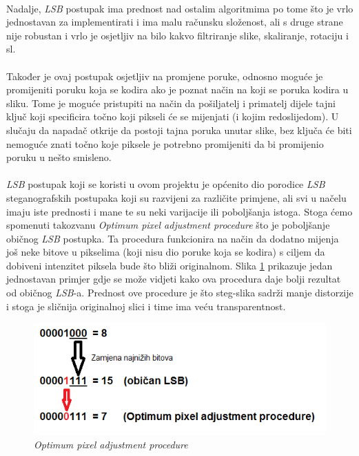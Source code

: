 \documentclass[times, utf8, seminar]{fer}
\begin{document}
\paragraph{}
Nadalje, \textit{LSB} postupak ima prednost nad ostalim algoritmima po tome što je vrlo jednostavan za implementirati i ima malu računsku složenost, ali s druge strane nije robustan i vrlo je osjetljiv na bilo kakvo filtriranje slike, skaliranje, rotaciju i sl. 
\paragraph{}
Također je ovaj postupak osjetljiv na promjene poruke, odnosno moguće je promijeniti poruku koja se kodira ako je poznat način na koji se poruka kodira u sliku. Tome je moguće pristupiti na način da pošiljatelj i primatelj dijele tajni ključ koji specificira točno koji pikseli će se mijenjati (i kojim redoslijedom). U slučaju da napadač otkrije da postoji tajna poruka unutar slike, bez ključa će biti nemoguće znati točno koje piksele je potrebno promijeniti da bi promijenio poruku u nešto smisleno.
\paragraph{}
\textit{LSB} postupak koji se koristi u ovom projektu je općenito dio porodice \textit{LSB} steganografskih postupaka koji su razvijeni za različite primjene, ali svi u načelu imaju iste prednosti i mane te su neki varijacije ili poboljšanja istoga. Stoga ćemo spomenuti takozvanu \textit{Optimum pixel adjustment procedure} što je poboljšanje običnog \textit{LSB} postupka. Ta procedura funkcionira na način da dodatno mijenja još neke bitove u pikselima (koji nisu dio poruke koja se kodira) s ciljem da dobiveni intenzitet piksela bude što bliži originalnom. Slika \ref{lsb_cmp} prikazuje jedan jednostavan primjer gdje se može vidjeti kako ova procedura daje bolji rezultat od običnog \textit{LSB}-a. Prednost ove procedure je što steg-slika sadrži manje distorzije i stoga je sličnija originalnoj slici i time ima veću transparentnost.
\begin{figure}
\caption{\textit{Optimum pixel adjustment procedure}}
\label{lsb_cmp}
\centerline{\includegraphics[scale=0.8]{images/LSB_cmp.png}}
\end{figure}
\end{document}
